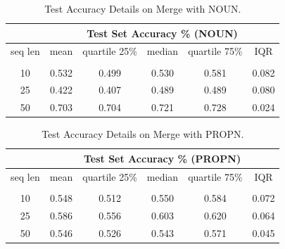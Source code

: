 \documentclass[12pt]{article}
\begin{document}
\begin{table}[!h]
\begin{tabular}{c|ccccc|}
\cline{2-6}
\multicolumn{1}{l|}{}         & \multicolumn{5}{c|}{Test Set Accuracy \% (NOUN)}                                                                                           \\ \hline
\multicolumn{1}{|c|}{seq len} & \multicolumn{1}{c|}{mean}  & \multicolumn{1}{c|}{quartile 25\%} & \multicolumn{1}{c|}{median} & \multicolumn{1}{c|}{quartile 75\%} & IQR   \\ \hline
\multicolumn{1}{|c|}{}        & \multicolumn{1}{c|}{}      & \multicolumn{1}{c|}{}              & \multicolumn{1}{c|}{}       & \multicolumn{1}{c|}{}              &       \\ \hline
\multicolumn{1}{|c|}{10}      & \multicolumn{1}{c|}{0.532} & \multicolumn{1}{c|}{0.499}         & \multicolumn{1}{c|}{0.530}  & \multicolumn{1}{c|}{0.581}         & 0.082 \\ \hline
\multicolumn{1}{|c|}{25}      & \multicolumn{1}{c|}{0.422} & \multicolumn{1}{c|}{0.407}         & \multicolumn{1}{c|}{0.489}  & \multicolumn{1}{c|}{0.489}         & 0.080 \\ \hline
\multicolumn{1}{|c|}{50}      & \multicolumn{1}{c|}{0.703} & \multicolumn{1}{c|}{0.704}         & \multicolumn{1}{c|}{0.721}  & \multicolumn{1}{c|}{0.728}         & 0.024 \\ \hline
\end{tabular}
\caption{Test Accuracy Details on Merge with NOUN.}
\label{appendix:nounMerge}
\end{table}

\begin{table}[!h]
\begin{tabular}{c|ccccc|}
\cline{2-6}
\multicolumn{1}{l|}{}         & \multicolumn{5}{c|}{Test Set Accuracy \% (PROPN)}                                                                                          \\ \hline
\multicolumn{1}{|c|}{seq len} & \multicolumn{1}{c|}{mean}  & \multicolumn{1}{c|}{quartile 25\%} & \multicolumn{1}{c|}{median} & \multicolumn{1}{c|}{quartile 75\%} & IQR   \\ \hline
\multicolumn{1}{|c|}{}        & \multicolumn{1}{c|}{}      & \multicolumn{1}{c|}{}              & \multicolumn{1}{c|}{}       & \multicolumn{1}{c|}{}              &       \\ \hline
\multicolumn{1}{|c|}{10}      & \multicolumn{1}{c|}{0.548} & \multicolumn{1}{c|}{0.512}         & \multicolumn{1}{c|}{0.550}  & \multicolumn{1}{c|}{0.584}         & 0.072 \\ \hline
\multicolumn{1}{|c|}{25}      & \multicolumn{1}{c|}{0.586} & \multicolumn{1}{c|}{0.556}         & \multicolumn{1}{c|}{0.603}  & \multicolumn{1}{c|}{0.620}         & 0.064 \\ \hline
\multicolumn{1}{|c|}{50}      & \multicolumn{1}{c|}{0.546} & \multicolumn{1}{c|}{0.526}         & \multicolumn{1}{c|}{0.543}  & \multicolumn{1}{c|}{0.571}         & 0.045 \\ \hline
\end{tabular}
\caption{Test Accuracy Details on Merge with PROPN.}
\label{appendix:propnMerge}
\end{table}
\end{document}
